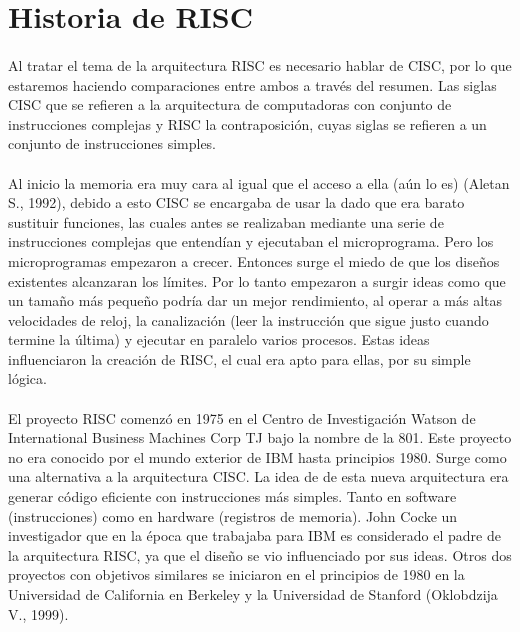 \documentclass[10pt,a4paper]{article}
\begin{document}
\section*{Historia de RISC}
\paragraph{}
Al tratar el tema de la arquitectura RISC es necesario hablar de CISC, por lo que estaremos haciendo comparaciones entre ambos a través del resumen. Las siglas CISC que se refieren a la arquitectura de computadoras con conjunto de instrucciones complejas y RISC la contraposición, cuyas siglas se refieren a un conjunto de instrucciones simples.

\paragraph{}
Al inicio la memoria era muy cara al igual que el acceso a ella (aún lo es) (Aletan S., 1992), debido a esto CISC se encargaba de usar la  dado que era barato sustituir funciones, las cuales antes se realizaban mediante una serie de instrucciones complejas que entendían y ejecutaban el microprograma. Pero los microprogramas empezaron a crecer. Entonces surge el miedo de que los diseños existentes alcanzaran los límites. Por lo tanto empezaron a surgir ideas como que un tamaño más pequeño podría dar un mejor rendimiento, al operar a más altas velocidades de reloj, la canalización (leer la instrucción que sigue justo cuando termine la última) y ejecutar en paralelo varios procesos. Estas ideas influenciaron la creación de RISC, el cual era apto para ellas, por su simple lógica.

\paragraph{}
El proyecto RISC comenzó en 1975 en el Centro de Investigación Watson de International Business Machines Corp TJ bajo la nombre de la 801. Este proyecto no era conocido por el mundo exterior de IBM hasta principios 1980. Surge como una alternativa a la arquitectura CISC. La idea de de esta nueva arquitectura era generar código eficiente con instrucciones más simples. Tanto en software (instrucciones) como en hardware (registros de memoria). John Cocke un investigador que en la época que trabajaba para IBM es considerado el padre de la arquitectura RISC, ya que el diseño se vio influenciado por sus ideas. Otros dos proyectos con objetivos similares se iniciaron en el principios de 1980 en la Universidad de California en Berkeley y la Universidad de Stanford (Oklobdzija V., 1999).
\end{document}
